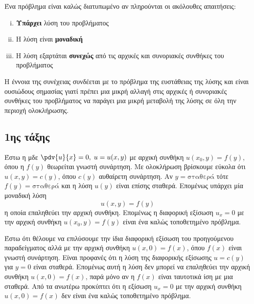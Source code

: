 \begin{mybox1}
  \begin{dfn}
    Ένα πρόβλημα είναι \textcolor{Col1}{καλώς διατυπωμένο} αν πληρούνται οι ακόλουθες 
    απαιτήσεις:
    \begin{enumerate}[i)]
      \item \textbf{Υπάρχει} λύση του προβλήματος
      \item Η λύση είναι \textbf{μοναδική}
      \item Η λύση εξαρτάται \textbf{συνεχώς} από τις αρχικές και συνοριακές συνθήκες 
        του προβλήματος
    \end{enumerate}
  \end{dfn}
\end{mybox1}

\begin{rem}
  Η έννοια της συνέχειας συνδέεται με το πρόβλημα της ευστάθειας της λύσης και είναι
  ουσιώδους σημασίας γιατί πρέπει μια μικρή αλλαγή στις αρχικές ή συνοριακές συνθήκες του
  προβλήματος να παράγει μια μικρή μεταβολή της λύσης σε όλη την περιοχή ολοκλήρωσης.
\end{rem}


\subsection*{1ης τάξης}

\begin{example}
  Έστω η μδε $ \pdv{u}{x} = 0, \; u=u(x,y) $ με αρχική συνθήκη $ u(x_{0},y) = f(y) $, 
  όπου η $ f(y) $ θεωρείται γνωστή συνάρτηση. Με ολοκλήρωση βρίσκουμε εύκολα ότι 
  $ u(x,y) = c(y) $, όπου $ c(y) $ αυθαίρετη συνάρτηση. Αν $ y= \text{σταθερά} $ τότε 
  $ f(y)= \text{σταθερά} $ και η λύση $ u(y)$ είναι επίσης σταθερά. Επομένως υπάρχει 
  μία μοναδική λύση 
  \[
    u(x,y)=f(y) 
  \]
  η οποία επαληθεύει την αρχική συνθήκη. Επομένως η διαφορική εξίσωση $ u_{x}=0 $ 
  με την αρχική συνθήκη $ u(x_{0},y) = f(y) $ είναι ένα καλώς τοποθετημένο πρόβλημα.
\end{example}

\begin{example}
  Έστω ότι θέλουμε να επιλύσουμε την ίδια διαφορική εξίσωση του προηγούμενου
  παραδείγματος αλλά με την αρχική συνθήκη $ u(x,0) = f(x) $, όπου $ f(x) $ είναι γνωστή 
  συνάρτηση. 
  Είναι προφανές ότι η λύση της διαφορικής εξίσωσης $ u=c(y) $ για $ y=0 $ είναι 
  σταθερά. Επομένως αυτή η λύση δεν μπορεί να επαληθεύει την αρχική συνθήκη $ u(x,0) = f(x)
  $, παρά μόνο αν η $ f(x) $ είναι ταυτοτικά ίση με μια σταθερά. Από τα ανωτέρω 
  προκύπτει ότι η εξίσωση $ u_{x}=0 $ με την αρχική συνθήκη $ u(x,0)=f(x) $ δεν είναι 
  ένα καλώς τοποθετημένο πρόβλημα.
\end{example}



